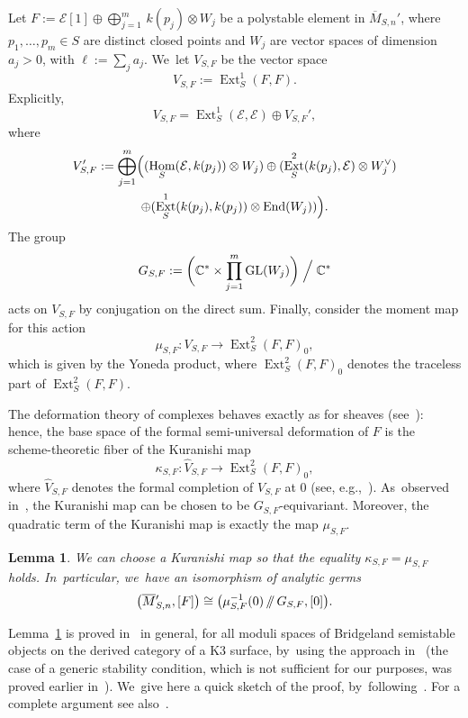 \documentclass[11pt]{article}
\providecommand\sslash{\mathop{/\mkern-5.5mu/}}
\newcommand{\CC}{{\mathbb C}}\let\C\CC
\newcommand\cE{\mathcal{E}}
\DeclareMathOperator{\End}{End}
\DeclareMathOperator{\Ext}{Ext}
\DeclareMathOperator{\GL}{GL}
\DeclareMathOperator{\Hom}{Hom}
\newtheorem{lemm}{Lemma}[section]
\theoremstyle{definition}
\begin{document}
Let $F:=\cE[1]\oplus \bigoplus_{j=1}^m\, k(p_j)\otimes W_j$ be a polystable element in $\overline{M}{}_{S,n}'$, where $p_1,\dots,p_m\in S$ are distinct closed points and $W_j$ are vector spaces of dimension $a_j>0$, with $\ell:=\sum_j a_j$. We~let $V_{S,F}$ be the vector space
\[
V_{S,F}:=\Ext^1_S(F,F).
\]
Explicitly,
\begin{equation*}\label{eq:SplittingK3Antony}
V_{S,F}=\Ext^1_S(\cE,\cE)\oplus V_{S,F}',
\end{equation*}
where
\begin{multline}\label{eqroma24}
V_{S,F}':=\bigoplus_{j=1}^m\Bigl((\Hom_S(\cE,k(p_j))\otimes W_j) \oplus (\Ext^2_S(k(p_j),\cE)\otimes W_j^\vee)\\
\oplus (\Ext^1_S(k(p_j),k(p_j))\otimes \End(W_j)) \Bigr).
\end{multline}
The group
\begin{equation}\label{eq:group}
G_{S,F}:=\biggl(\CC^*\times \prod_{j=1}^m\GL(W_j)\biggr)\Bigm/\CC^*
\end{equation}
acts on $V_{S,F}$ by conjugation on the direct sum.
Finally, consider the moment map for this action
\[
\mu_{S,F}\colon V_{S,F} \to \Ext^2_S(F,F)_0,
\]
which is given by the Yoneda product, where $\Ext^2_S(F,F)_0$ denotes the traceless part of $\Ext^2_S(F,F)$.

The deformation theory of complexes behaves exactly as for sheaves (see~\cite[Th.\,3.1.1]{Lieblich:moduli}): hence, the base space of the formal semi-universal deformation of $F$ is the scheme-theoretic fiber of the Kuranishi map
\[
\kappa_{S,F} \colon \widehat{V}_{S,F} \to \Ext^2_S(F,F)_0,
\]
where $\widehat{V}_{S,F}$ denotes the formal completion of $V_{S,F}$ at $0$ (see, e.g.,~\cite[\S 3]{AS:singularities}). As~observed in~\cite[\S 4]{AS:singularities}, the Kuranishi map can be chosen to be $G_{S,F}$-equivariant.
Moreover, the quadratic term of the Kuranishi map is exactly the map $\mu_{S,F}$.

\begin{lemm}\label{lem:KuranishiK3}
We can choose a Kuranishi map so that the equality $\kappa_{S,F}=\mu_{S,F}$ holds. In~particular, we~have an isomorphism of analytic germs
\[
\left(\overline{M}{}_{S,n}',[F]\right)\cong \bigl(\mu_{S,F}^{-1}(0)\sslash G_{S,F},[0]\bigr).
\]
\end{lemm}

Lemma~\ref{lem:KuranishiK3} is proved in~\cite[\S 3.2]{PZ:FormalityBridgeland} in general, for all moduli spaces of Bridgeland semistable objects on the derived category of a K3 surface, by~using the approach in~\cite{BMM:Formality} (the case of a generic stability condition, which is not sufficient for our purposes, was proved earlier in~\cite{BZ:Kuranishi}). We~give here a quick sketch of the proof, by~following~\cite{PZ:FormalityBridgeland}. For a complete argument see also~\cite[Th.\,3.2]{AS:Formality}.
\end{document}
